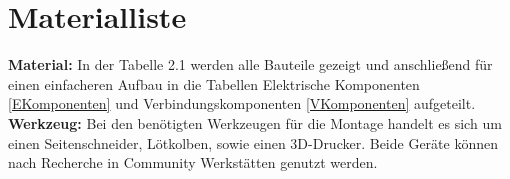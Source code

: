 %
%

\chapter{Materialliste}

\textbf{Material:}
In der Tabelle 2.1 werden alle Bauteile gezeigt und anschließend für einen einfacheren Aufbau in die Tabellen Elektrische Komponenten \ref{EKomponenten} und Verbindungskomponenten \ref{VKomponenten} aufgeteilt. \\

\textbf{Werkzeug:}
Bei den benötigten Werkzeugen für die Montage handelt es sich um einen Seitenschneider, Lötkolben, sowie einen 3D-Drucker. Beide Geräte können nach Recherche in Community Werkstätten genutzt werden. 

